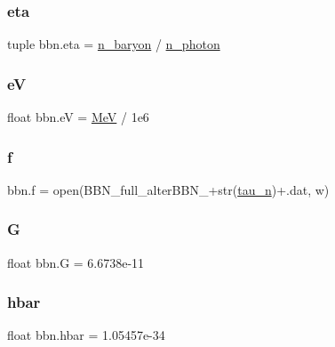 \mbox{\label{namespacebbn_ace64c472b0c59f5fd0f811cd4dcdc2b4}} 
\subsubsection{\texorpdfstring{eta}{eta}}
{\footnotesize\ttfamily tuple bbn.\+eta = \mbox{\hyperlink{namespacebbn_a08ca9283eb4fca8cde9e83fc5a201313}{n\+\_\+baryon}} / \mbox{\hyperlink{namespacebbn_afb075d5c6ea4d70b7b6b502224ffbac9}{n\+\_\+photon}}}

\mbox{\label{namespacebbn_a0747e524be761d23d14e43f4f45d522a}} 
\subsubsection{\texorpdfstring{eV}{eV}}
{\footnotesize\ttfamily float bbn.\+eV = \mbox{\hyperlink{namespacebbn_a3a99f29ae890693870353fa67b0b034c}{MeV}} / 1e6}

\mbox{\label{namespacebbn_aea59ac7535e41dcb59e7a347152270e7}} 
\subsubsection{\texorpdfstring{f}{f}}
{\footnotesize\ttfamily bbn.\+f = open(\textquotesingle{}B\+B\+N\+\_\+full\+\_\+alter\+B\+B\+N\+\_\+\textquotesingle{}+str(\mbox{\hyperlink{namespacebbn_a159aaa1465ea9c0555826fa3ea17d3ed}{tau\+\_\+n}})+\textquotesingle{}.dat\textquotesingle{}, \textquotesingle{}w\textquotesingle{})}

\mbox{\label{namespacebbn_a52f93a6b9a98bb4b459145af6e1c0ffd}} 
\subsubsection{\texorpdfstring{G}{G}}
{\footnotesize\ttfamily float bbn.\+G = 6.\+6738e-\/11}

\mbox{\label{namespacebbn_aa4b15a6720cfbfaebb9a8ba90c2d6615}} 
\subsubsection{\texorpdfstring{hbar}{hbar}}
{\footnotesize\ttfamily float bbn.\+hbar = 1.\+05457e-\/34}


